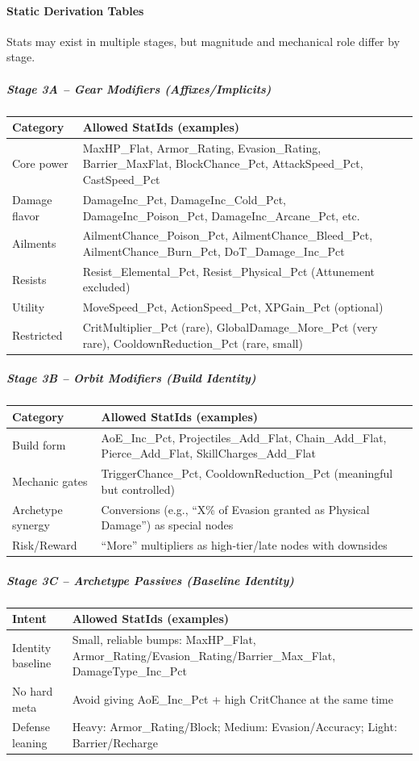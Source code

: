 \paragraph{Static Derivation Tables}

Stats may exist in multiple stages, but magnitude and mechanical role differ by stage.

\subparagraph{Stage 3A -- Gear Modifiers (Affixes/Implicits)}
\begin{tabular}{l|p{11cm}}
	\textbf{Category} & \textbf{Allowed StatIds (examples)} \\ \hline
	Core power & MaxHP\_Flat, Armor\_Rating, Evasion\_Rating, Barrier\_MaxFlat, BlockChance\_Pct, AttackSpeed\_Pct, CastSpeed\_Pct \\
	Damage flavor & DamageInc\_Pct, DamageInc\_Cold\_Pct, DamageInc\_Poison\_Pct, DamageInc\_Arcane\_Pct, etc. \\
	Ailments & AilmentChance\_Poison\_Pct, AilmentChance\_Bleed\_Pct, AilmentChance\_Burn\_Pct, DoT\_Damage\_Inc\_Pct \\
	Resists & Resist\_Elemental\_Pct, Resist\_Physical\_Pct (Attunement excluded) \\
	Utility & MoveSpeed\_Pct, ActionSpeed\_Pct, XPGain\_Pct (optional) \\
	Restricted & CritMultiplier\_Pct (rare), GlobalDamage\_More\_Pct (very rare), CooldownReduction\_Pct (rare, small) \\
\end{tabular}

\subparagraph{Stage 3B -- Orbit Modifiers (Build Identity)}
\begin{tabular}{l|p{11cm}} 
	\textbf{Category} & \textbf{Allowed StatIds (examples)} \\ \hline
	Build form & AoE\_Inc\_Pct, Projectiles\_Add\_Flat, Chain\_Add\_Flat, Pierce\_Add\_Flat, SkillCharges\_Add\_Flat \\
	Mechanic gates & TriggerChance\_Pct, CooldownReduction\_Pct (meaningful but controlled) \\
	Archetype synergy & Conversions (e.g., ``X\% of Evasion granted as Physical Damage'') as special nodes \\
	Risk/Reward & ``More'' multipliers as high-tier/late nodes with downsides \\
\end{tabular}

\subparagraph{Stage 3C -- Archetype Passives (Baseline Identity)}
\begin{tabular}{l|p{11cm}}
	\textbf{Intent} & \textbf{Allowed StatIds (examples)} \\ \hline
	Identity baseline & Small, reliable bumps: MaxHP\_Flat, Armor\_Rating/Evasion\_Rating/Barrier\_Max\_Flat, DamageType\_Inc\_Pct \\
	No hard meta & Avoid giving AoE\_Inc\_Pct + high CritChance at the same time \\
	Defense leaning & Heavy: Armor\_Rating/Block; Medium: Evasion/Accuracy; Light: Barrier/Recharge \\
\end{tabular}


